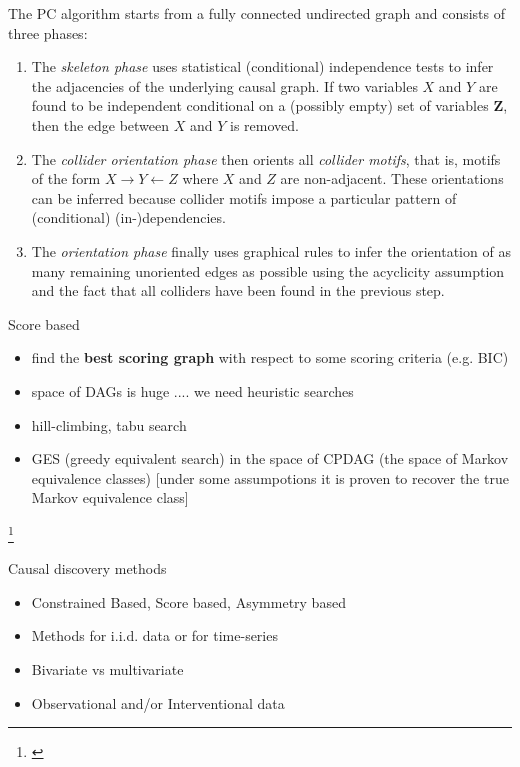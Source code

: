\documentclass{beamer}
\newcommand\blfootnote[1]{%
  \begingroup
  \renewcommand\thefootnote{}\footnote{#1}%
  \addtocounter{footnote}{-1}%
  \endgroup
}
\begin{document}
\begin{frame}
	The PC algorithm starts from a fully connected undirected graph and consists of three phases:
\begin{enumerate}
\item The \emph{skeleton phase} uses statistical (conditional) independence tests to infer the adjacencies of the underlying causal graph. %
If two variables $X$ and $Y$ are found to be independent conditional on a (possibly empty) set of variables $\mathbf{Z}$, then the edge between $X$ and $Y$ is removed.
\item The \emph{collider orientation phase} then orients all \emph{collider motifs}, that is, motifs of the form $X \rightarrow Y \leftarrow Z$ where $X$ and $Z$ are non-adjacent. These orientations can be inferred because collider motifs impose a particular pattern of (conditional) (in-)dependencies.
\item The \emph{orientation phase} finally uses graphical rules \citep{meek1995causal} to infer the orientation of as many remaining unoriented edges as possible using the acyclicity assumption and the fact that all colliders have been found in the previous step.
\end{enumerate}
\end{frame}


\begin{frame}{Score based}
	\begin{itemize}
		\item<1-> find the \textbf{best scoring graph} with respect to some scoring criteria (e.g. BIC) 
		\item<2-> space of DAGs is huge .... we need heuristic searches  
		\item<3-> hill-climbing, tabu search 

		\item<4-> GES (greedy equivalent search) in the space of CPDAG (the space of Markov equivalence classes) [under some assumpotions it is proven to recover the true Markov equivalence class] 
	\end{itemize}
	\blfootnote{\citet{chickering2002optimal}}
\end{frame}

\begin{frame}{Causal discovery methods}
	\begin{itemize}
		\item Constrained Based, Score based, Asymmetry based 
		\item Methods for i.i.d. data or for time-series 
		\item Bivariate vs multivariate
		\item Observational and/or Interventional data  
	\end{itemize}
\end{frame}
\end{document}

